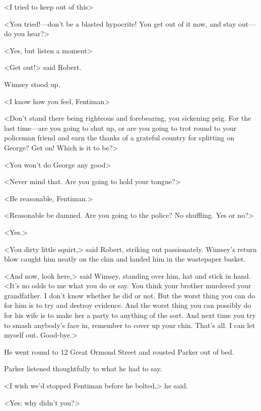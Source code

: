 <I tried to keep out of this\longdash>

<You tried!—don't be a blasted hypocrite! You get out of it now, and stay out—do you hear?>

<Yes, but listen a moment\longdash>

<Get out!> said Robert.

Wimsey stood up.

<I know how you feel, Fentiman\longdash>

<Don't stand there being righteous and forebearing, you sickening prig. For the last time—are you going to shut up, or are you going to trot round to your policeman friend and earn the thanks of a grateful country for splitting on George? Get on! Which is it to be?>

<You won't do George any good\longdash>

<Never mind that. Are you going to hold your tongue?>

<Be reasonable, Fentiman.>

<Reasonable be damned. Are you going to the police? No shuffling. Yes or no?>

<Yes.>

<You dirty little squirt,> said Robert, striking out passionately. Wimsey's return blow caught him neatly on the chin and landed him in the wastepaper basket.

<And now, look here,> said Wimsey, standing over him, hat and stick in hand. <It's no odds to me what you do or say. You think your brother murdered your grandfather. I don't know whether he did or not. But the worst thing you can do for him is to try and destroy evidence. And the worst thing you can possibly do for his wife is to make her a party to anything of the sort. And next time you try to smash anybody's face in, remember to cover up your chin. That's all. I can let myself out. Good-bye.>

He went round to 12 Great Ormond Street and rousted Parker out of bed.

Parker listened thoughtfully to what he had to say.

<I wish we'd stopped Fentiman before he bolted,> he said.

<Yes; why didn't you?>

